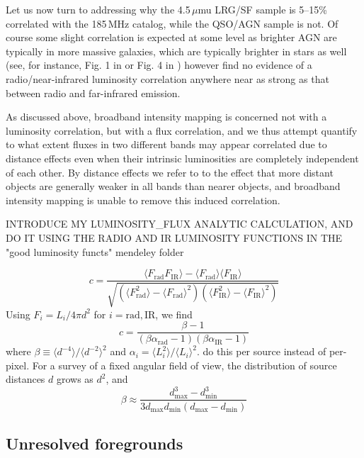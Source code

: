 \documentclass[preprint]{aastex}
\newcommand{\mintext}{\text{min}}
\newcommand{\maxtext}{\text{max}}
\newcommand{\rad}{\text{rad}}
\newcommand{\ir}{\text{IR}}
\begin{document}
Let us now turn to addressing why the 4.5\,$\mu$mu LRG/SF sample is 5--15\% correlated with the 185\,MHz catalog, while the QSO/AGN sample is not. Of course some slight correlation is expected at some level as brighter AGN are typically in more massive galaxies, which are typically brighter in stars as well (see, for instance, Fig. 1 in \citep{seymour07} or Fig. 4 in \citep{Willott03}) however \citet{mauch07} find no evidence of a radio/near-infrared luminosity correlation anywhere near as strong as that between radio and far-infrared emission. 

As discussed above, broadband intensity mapping is concerned not with a luminosity correlation, but with a flux correlation, and we thus attempt quantify to what extent fluxes in two different bands may appear correlated due to distance effects even when their intrinsic luminosities are completely independent of each other. By distance effects we refer to to the effect that more distant objects are generally weaker in all bands than nearer objects, and broadband intensity mapping is unable to remove this induced correlation.

INTRODUCE MY LUMINOSITY_FLUX ANALYTIC CALCULATION, AND DO IT USING THE RADIO AND IR LUMINOSITY FUNCTIONS IN THE "good luminosity functs" mendeley folder

\begin{equation}
	c = \frac{\langle F_\rad F_\ir \rangle-\langle F_\rad\rangle\langle F_\ir\rangle}{\sqrt{(\langle F_\rad^2\rangle-\langle F_\rad\rangle^2)(\langle F_\ir^2\rangle-\langle F_\ir\rangle^2)}}
\end{equation}
Using $F_i=L_i/4\pi d^2$ for $i=\rad,\ir$, we find
\begin{equation}
	c = \frac{\beta-1}{(\beta\alpha_\rad-1)(\beta\alpha_\ir-1)}
\end{equation}
where $\beta\equiv\langle d^{-4}\rangle/\langle d^{-2}\rangle^2$ and $\alpha_i=\langle L_i^2\rangle/\langle L_i\rangle^2$.
do this per source instead of per-pixel. For a survey of a fixed angular field of view, the distribution of source distances $d$ grows as $d^2$, and 
\begin{equation}
	\beta\approx\frac{d_\maxtext^3-d_\mintext^3}{3d_\maxtext d_\mintext (d_\maxtext-d_\mintext)}
\end{equation}

\subsection{Unresolved foregrounds}
\end{document}
